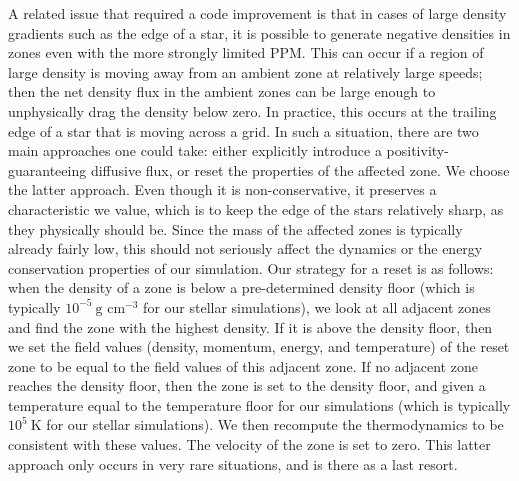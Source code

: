 \documentclass[12pt]{article}
\begin{document}
A related issue that required a code improvement is that in cases of
large density gradients such as the edge of a star, it is possible to
generate negative densities in zones even with the more strongly
limited PPM. This can occur if a region of large density is moving
away from an ambient zone at relatively large speeds; then the net
density flux in the ambient zones can be large enough to unphysically
drag the density below zero. In practice, this occurs at the
trailing edge of a star that is moving across a grid. In such a
situation, there are two main approaches one could take: either
explicitly introduce a positivity-guaranteeing diffusive flux, or
reset the properties of the affected zone. We choose the latter
approach. Even though it is non-conservative, it preserves a
characteristic we value, which is to keep the edge of the stars
relatively sharp, as they physically should be. Since the mass of the
affected zones is typically already fairly low, this should not
seriously affect the dynamics or the energy conservation properties of our
simulation. Our strategy for a reset is as follows: when the density of 
a zone is below a pre-determined density floor (which is typically 
$10^{-5}\ \text{g cm}^{-3}$ for our stellar simulations), we look
at all adjacent zones and find the zone with the highest density.
If it is above the density floor, then we set the field values 
(density, momentum, energy, and temperature) of the
reset zone to be equal to the field values of this 
adjacent zone. If no adjacent zone reaches the density floor, then
the zone is set to the density floor, and given a temperature equal 
to the temperature floor for our simulations (which is typically 
$10^{5}\ \text{K}$ for our stellar simulations). We then recompute 
the thermodynamics to be consistent with these values. The 
velocity of the zone is set to zero. This latter approach only
occurs in very rare situations, and is there as a last resort.
\end{document}
